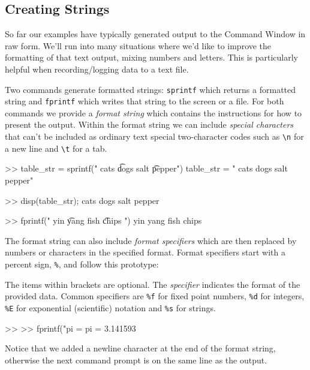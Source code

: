 \documentclass[../../book.tex]{subfiles}
\begin{document}
\subsection{Creating Strings}

So far our examples have typically generated output to the Command Window in raw form.  We'll run into many situations where we'd like to improve the formatting of that text output, mixing numbers and letters.  This is particularly helpful when recording/logging data to a text file.

Two commands generate formatted strings: \lstinline{sprintf} which returns a formatted string 
and \lstinline{fprintf} which writes that string to the screen or a file.  For both commands we provide a \emph{format string} which contains the instructions for how to present the output.  Within the format string we can include \emph{special characters} that can't be included as ordinary text special two-character codes such as \lstinline{\n} for a new line and \lstinline{\t} for a tab.

\begin{code}
>> table_str = sprintf(" cats \t dogs \n salt \t pepper")
table_str = 
    " cats 	 dogs 
      salt 	 pepper"

>> disp(table_str);
 cats 	 dogs 
 salt 	 pepper

>> fprintf(" yin \t yang \n fish \t chips \n")
 yin 	 yang 
 fish 	 chips 
\end{code}

The format string can also include \emph{format specifiers} which are then replaced by numbers or characters in the specified format.  Format specifiers start with a percent sign, \lstinline{%}, and follow this prototype:
\begin{stdout}
\end{stdout}   
The items within brackets are optional.  The \emph{specifier} indicates the format of the provided data.  Common specifiers are \lstinline{%f} for fixed point numbers, \lstinline{%d} for integers, \lstinline{%E} for exponential (scientific) notation and \lstinline{%s} for strings.

\begin{code}
>> %
>> fprintf("pi = %
pi = 3.141593
\end{code}
Notice that we added a newline character at the end of the format string, otherwise the next command prompt is on the same line as the output.
\end{document}

